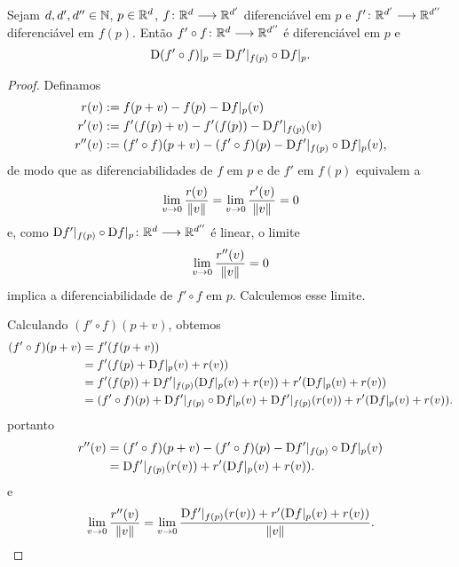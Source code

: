 \begin{proposition}
Sejam $d,d',d'' \in \mathbb{N}$, $p \in \mathbb{R}^d$, ${f}\colon {\mathbb{R}^d} \longrightarrow {\mathbb{R}^{d'}}$ diferenciável em $p$ e ${f'}\colon {\mathbb{R}^{d'}} \longrightarrow {\mathbb{R}^{d''}}$ diferenciável em $f(p)$. Então ${f' \circ f}\colon {\mathbb{R}^d} \longrightarrow {\mathbb{R}^{d''}}$ é diferenciável em $p$ e
	\begin{equation*}
	\mathrm{D} (f' \circ f)|_p = \mathrm{D} f'|_{f(p)} \circ \mathrm{D} f|_p.
	\end{equation*}
\end{proposition}
\begin{proof} Definamos
	\begin{align*}
	r(v) &:= f(p+v) - f(p) - \mathrm{D} f|_p(v) \\
	r'(v) &:= f'(f(p)+v) - f'(f(p)) - \mathrm{D} f'|_{f(p)}(v) \\
	r''(v) &:= (f' \circ f)(p+v) - (f' \circ f)(p) - \mathrm{D} f'|_{f(p)} \circ \mathrm{D} f|_p(v),
	\end{align*}
de modo que as diferenciabilidades de $f$ em $p$ e de $f'$ em $f(p)$ equivalem a
	\begin{equation*}
	\lim_{v \rightarrow 0} \frac{r(v)}{\left\Vert{v}\right\Vert} = \lim_{v \rightarrow 0} \frac{r'(v)}{\left\Vert{v}\right\Vert} = 0
	\end{equation*}
e, como ${\mathrm{D} f'|_{f(p)} \circ \mathrm{D} f|_p}\colon {\mathbb{R}^d} \longrightarrow {\mathbb{R}^{d''}}$ é linear, o limite
	\begin{equation*}
	\lim_{v \rightarrow 0} \frac{r''(v)}{\left\Vert{v}\right\Vert} = 0
	\end{equation*}
implica a diferenciabilidade de $f' \circ f$ em $p$. Calculemos esse limite. 

Calculando $(f' \circ f)(p+v)$, obtemos
	\begin{align*}
	(f' \circ f)(p+v) &= f'(f(p+v)) \\
		&= f'(f(p)+\mathrm{D} f|_p(v) + r(v)) \\
		&= f'(f(p)) + \mathrm{D} f'|_{f(p)} (\mathrm{D} f|_p(v) + r(v)) + r'(\mathrm{D} f|_p(v) + r(v)) \\
		&= (f' \circ f)(p) + \mathrm{D} f'|_{f(p)} \circ \mathrm{D} f|_p(v) + \mathrm{D} f'|_{f(p)}(r(v)) + r'(\mathrm{D} f|_p(v) + r(v)).
	\end{align*}
portanto
	\begin{align*}
	r''(v) &= (f' \circ f)(p+v) - (f' \circ f)(p) - \mathrm{D} f'|_{f(p)} \circ \mathrm{D} f|_p(v) \\
		&= \mathrm{D} f'|_{f(p)}(r(v)) + r'(\mathrm{D} f|_p(v) + r(v)).
	\end{align*}
e
	\begin{equation*}
	\lim_{v \rightarrow 0} \frac{r''(v)}{\left\Vert{v}\right\Vert} = \lim_{v \rightarrow 0} \frac{\mathrm{D} f'|_{f(p)}(r(v)) + r'(\mathrm{D} f|_p(v) + r(v))}{\left\Vert{v}\right\Vert}.
	\end{equation*}


\end{proof}
